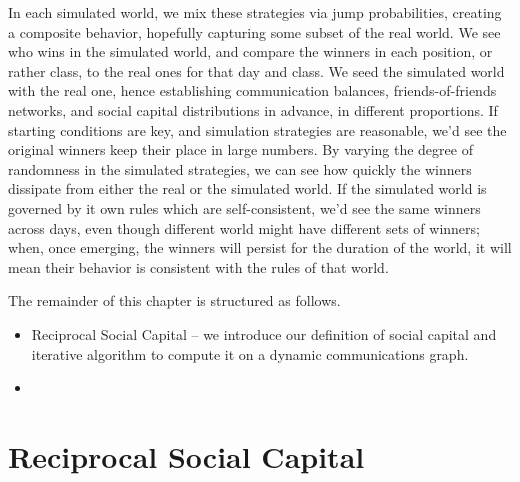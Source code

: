 \documentclass[10pt,oneside]{memoir}
\begin{document}
In each simulated world, we mix these strategies via jump probabilities, creating a composite behavior, hopefully capturing some subset of the real world.  We see who wins in the simulated world, and compare the winners in each position, or rather class, to the real ones for that day and class.  We seed the simulated world with the real one, hence establishing communication balances, friends-of-friends networks, and social capital distributions in advance, in different proportions.  If starting conditions are key, and simulation strategies are reasonable, we'd see the original winners keep their place in large numbers.  By varying the degree of randomness in the simulated strategies, we can see how quickly the winners dissipate from either the real or the simulated world.  If the simulated world is governed by it own rules which are self-consistent, we'd see the same winners across days, even though different world might have different sets of winners; when, once emerging, the winners will persist for the duration of the world, it will mean their behavior is consistent with the rules of that world.


The remainder of this chapter is structured as follows.


\begin{itemize}


\item Reciprocal Social Capital -- we introduce our definition of social capital and iterative algorithm to compute it on a dynamic communications graph.

\item 
\end{itemize}

\pagebreak \section{Reciprocal Social Capital}
\label{reciprocalsocialcapital}

\label{chapter:SocialCapital}
\end{document}

